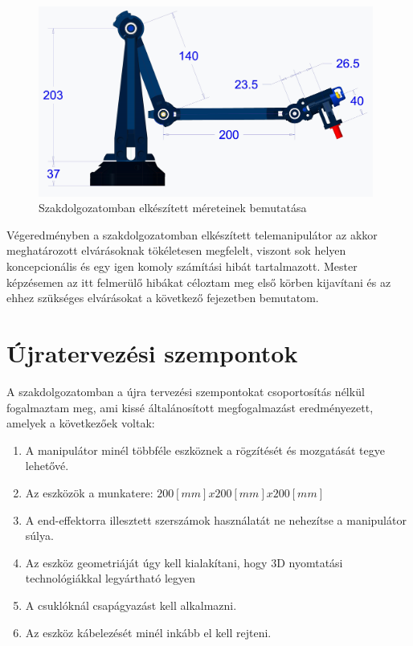 \begin{figure}[!ht]
\centering
\includegraphics[width=110mm, keepaspectratio]{figures/Szakdoga/00_v_4_kar}
\caption{Szakdolgozatomban elkészített méreteinek bemutatása}
\label{fig:Szakdoga_csipeszes}
\end{figure}

Végeredményben a szakdolgozatomban elkészített telemanipulátor az akkor meghatározott elvárásoknak tökéletesen megfelelt, viszont sok helyen koncepcionális és egy igen komoly számítási hibát tartalmazott. Mester képzésemen az itt felmerülő hibákat céloztam meg első körben kijavítani és az ehhez szükséges elvárásokat a következő fejezetben bemutatom.

\section{Újratervezési szempontok}

A szakdolgozatomban a újra tervezési szempontokat csoportosítás nélkül fogalmaztam meg, ami kissé általánosított megfogalmazást eredményezett, amelyek a következőek voltak:

\begin{enumerate}
\item A manipulátor minél többféle eszköznek a rögzítését és mozgatását tegye lehetővé.
\item Az eszközök a munkatere: $200[mm]x200[mm]x200[mm]$
\item A end-effektorra illesztett szerszámok használatát ne nehezítse a manipulátor súlya.
\item Az eszköz geometriáját úgy kell kialakítani, hogy 3D nyomtatási technológiákkal legyártható legyen
\item A csuklóknál csapágyazást kell alkalmazni.
\item Az eszköz kábelezését minél inkább el kell rejteni.
\end{enumerate}


